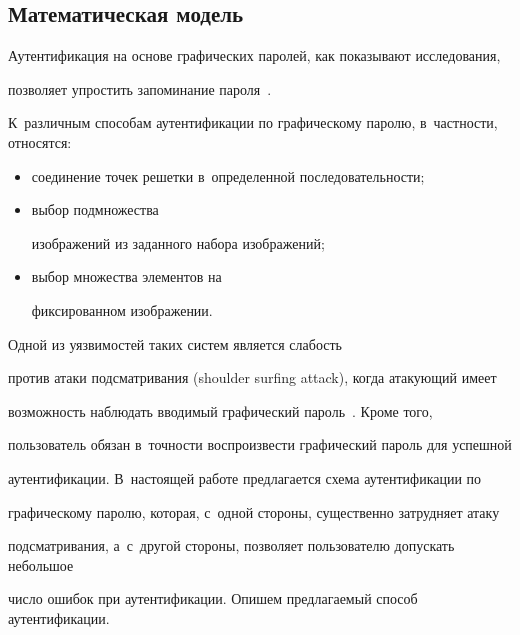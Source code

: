 \label{graph}





\subsection{Математическая модель}


    


    








Аутентификация на основе графических паролей, как показывают исследования, 


позволяет упростить запоминание пароля~\cite{Rit2013, Ang2005}.


 К~различным способам аутентификации по графическому паролю, в~част\-ности, относятся: 


\begin{itemize}


\item соединение точек решетки в~определенной последовательности; 


\item выбор подмножества 


 изоб\-ра\-же\-ний из заданного набора изображений;


 \item  выбор множества элементов на 


 фиксированном изображении.


 \end{itemize}


  Одной из уязвимостей таких сис\-тем является слабость 


 против атаки подсматривания (shoulder surfing attack), когда атакующий имеет 


 возможность наблюдать вводимый графический пароль~\cite{Rit2013}. Кроме того, 


 пользователь обязан в~точности воспроизвести графический пароль для успешной 


 аутентификации. В~настоящей работе предлагается схема аутентификации по 


 графическому паролю, которая, с~одной стороны, существенно затрудняет атаку 


 подсматривания, а~с~другой стороны, позволяет пользователю допускать небольшое 


 число ошибок при аутентификации. Опишем предлагаемый способ аутентификации.





